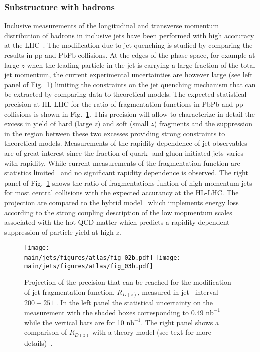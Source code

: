 \subsubsection{Substructure with hadrons}
Inclusive measurements of the longitudinal and transverse momentum distribution of hadrons in inclusive jets have been performed with high acccuracy at the LHC~\cite{Aaboud:2018hpb,Sirunyan:2018jqr}. The modification due to jet quenching is studied by comparing the results in pp and PbPb collisions. At the edges of the phase space, for example at large $z$ when the leading particle in the jet is carrying a large fraction of the total jet momentum, the current experimental uncertainties are however large (see left panel of Fig.~\ref{fig:jetDz}) limiting the constraints on the jet quenching mechanism that can be extracted by comparing data to theoretical models. The expected statistical precision at HL-LHC for the ratio of fragmentation functions in PbPb and pp collisions is shown in Fig.~\ref{fig:jetDz}. This precision will allow to characterize in detail the excess in yield of hard (large $z$) and soft (small $z$) fragments and the suppression in the region between these two excesses providing strong constraints to theoretical models. Measurements of the rapidity dependence of jet observables are of great interest since the fraction of quark- and gluon-initiated jets varies with rapidity. While current measurements of the fragmentation function are statistics limited~\cite{Aaboud:2018hpb} and no significant rapidity dependence is observed. The right panel of Fig.~\ref{fig:jetDz} shows the ratio of fragmentations funtion of high momentum jets for most central collisions with the expected accurancy at the HL-LHC. The projection are compared to the hybrid model~\cite{Casalderrey-Solana:2014bpa,Hulcher:2017cpt} which implements energy loss according to the strong coupling description of the low mopmentum scales associated with the hot QCD matter which predicts a rapidity-dependent suppression of particle yield at high $z$. 
\begin{figure}[!ht]
\begin{center}
\texttt{[image: \\main/jets/figures/atlas/fig\_02b.pdf]}
\texttt{[image: \\main/jets/figures/atlas/fig\_03b.pdf]}
\caption{Projection of the precision that can be reached for the modification of jet fragmentation function, $R_{D(z)}$, measured in jet \pT\ interval $200-251$ \gevc. In the left panel the statistical uncertainty on the measurement with the shaded boxes corresponding to 0.49 $\mathrm{nb}^{-1}$ while the vertical bars are for 10 $\mathrm{nb}^{-1}$. The right panel shows a comparison of $R_{D(z)}$ with a theory model (see text for more details)~\cite{ATL-PHYS-PUB-2018-019}.}
\label{fig:jetDz}
\end{center}
\end{figure}

